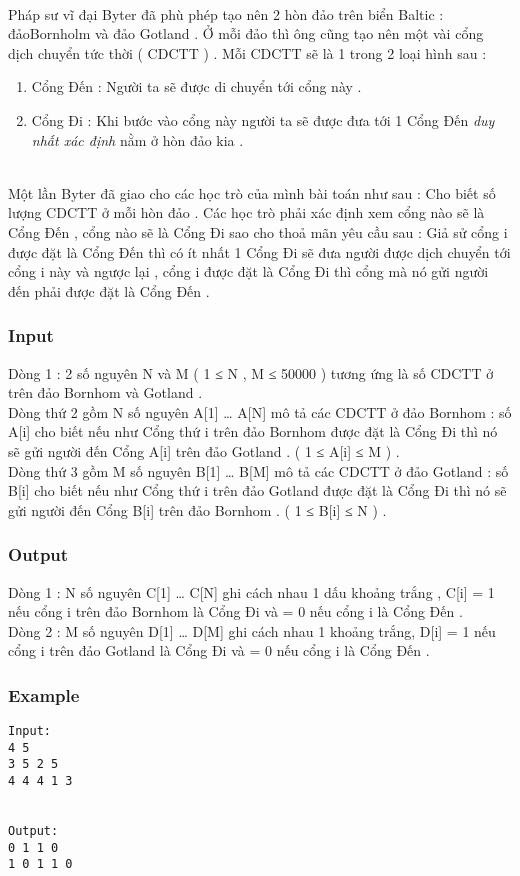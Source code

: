 

 

Pháp sư vĩ đại Byter đã phù phép tạo nên 2 hòn đảo trên biển Baltic : đảoBornholm và đảo Gotland . Ở mỗi đảo thì ông cũng tạo nên một vài cổng dịch chuyển tức thời ( CDCTT ) . Mỗi CDCTT sẽ là 1 trong 2 loại hình sau :
\begin{enumerate}
	\item Cổng Đến : Người ta sẽ được di chuyển tới cổng này .
	\item Cổng Đi : Khi bước vào cổng này người ta sẽ được đưa tới 1 Cổng Đến \emph{ duy nhất xác định } nằm ở hòn đảo kia .
\end{enumerate}


\\Một lần Byter đã giao cho các học trò của mình bài toán như sau : Cho biết số lượng CDCTT ở mỗi hòn đảo . Các học trò phải xác định xem cổng nào sẽ là Cổng Đến , cổng nào sẽ là Cổng Đi sao cho thoả mãn yêu cầu sau : Giả sử cổng i được đặt là Cổng Đến thì có ít nhất 1 Cổng Đi sẽ đưa người được dịch chuyển tới cổng i này và ngược lại , cổng i được đặt là Cổng Đi thì cổng mà nó gửi người đến phải được đặt là Cổng Đến .

\subsubsection{Input}

Dòng 1 : 2 số nguyên N và M ( 1 ≤ N , M ≤ 50000 ) tương ứng là số CDCTT ở trên đảo Bornhom và Gotland .
\\Dòng thứ 2 gồm N số nguyên A[1] … A[N] mô tả các CDCTT ở đảo Bornhom : số A[i] cho biết nếu như Cổng thứ i trên đảo Bornhom được đặt là Cổng Đi thì nó sẽ gửi người đến Cổng A[i] trên đảo Gotland . ( 1 ≤ A[i] ≤ M ) .
\\Dòng thứ 3 gồm M số nguyên B[1] … B[M] mô tả các CDCTT ở đảo Gotland : số B[i] cho biết nếu như Cổng thứ i trên đảo Gotland được đặt là Cổng Đi thì nó sẽ gửi người đến Cổng B[i] trên đảo Bornhom . ( 1 ≤ B[i] ≤ N ) .

\subsubsection{Output}

Dòng 1 : N số nguyên C[1] … C[N] ghi cách nhau 1 dấu khoảng trắng , C[i] = 1 nếu cổng i trên đảo Bornhom là Cổng Đi và = 0 nếu cổng i là Cổng Đến .
\\Dòng 2 : M số nguyên D[1] … D[M] ghi cách nhau 1 khoảng trắng, D[i] = 1 nếu cổng i trên đảo Gotland là Cổng Đi và = 0 nếu cổng i là Cổng Đến .

\subsubsection{Example}
\begin{verbatim}
Input:
4 5
3 5 2 5
4 4 4 1 3


Output:
0 1 1 0
1 0 1 1 0

\end{verbatim}